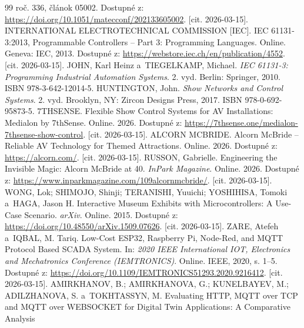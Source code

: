 \begin{thebibliography}{99}
    roč. 336, článok 05002.
    Dostupné z: \url{https://doi.org/10.1051/matecconf/202133605002}. [cit. 2026-03-15].
    INTERNATIONAL ELECTROTECHNICAL COMMISSION [IEC].
    IEC 61131-3:2013, Programmable Controllers -- Part 3:
    Programming Languages. Online.
    Geneva: IEC, 2013.
    Dostupné z: \url{https://webstore.iec.ch/en/publication/4552}. [cit. 2026-03-15].
    JOHN, Karl Heinz a~TIEGELKAMP, Michael.
    \textit{IEC 61131-3: Programming Industrial Automation
    Systems}.
    2. vyd. Berlin: Springer, 2010. ISBN 978-3-642-12014-5.
    HUNTINGTON, John.
    \textit{Show Networks and Control Systems}.
    2. vyd. Brooklyn, NY: Zircon Designs Press, 2017.
    ISBN 978-0-692-95873-5.
    7THSENSE.
    Flexible Show Control Systems for AV Installations:
    Medialon by 7thSense. Online. 2026.
    Dostupné z: \url{https://7thsense.one/medialon-7thsense-show-control}. [cit. 2026-03-15].
    ALCORN MCBRIDE.
    Alcorn McBride -- Reliable AV Technology for Themed
    Attractions. Online. 2026.
    Dostupné z: \url{https://alcorn.com/}. [cit. 2026-03-15].
    RUSSON, Gabrielle.
    Engineering the Invisible Magic: Alcorn McBride at 40.
    \textit{InPark Magazine}. Online. 2026.
    Dostupné z: \url{https://www.inparkmagazine.com/109alcornmcbride/}. [cit. 2026-03-15].
    WONG, Lok; SHIMOJO, Shinji; TERANISHI, Yuuichi;
    YOSHIHISA, Tomoki a~HAGA, Jason H.
    Interactive Museum Exhibits with Microcontrollers:
    A Use-Case Scenario.
    \textit{arXiv}. Online. 2015.
    Dostupné z: \url{https://doi.org/10.48550/arXiv.1509.07626}. [cit. 2026-03-15].
    ZARE, Atefeh a~IQBAL, M. Tariq.
    Low-Cost ESP32, Raspberry Pi, Node-Red, and MQTT Protocol
    Based SCADA System.
    In: \textit{2020 IEEE International IOT, Electronics and
    Mechatronics Conference (IEMTRONICS)}. Online.
    IEEE, 2020, s. 1--5.
    Dostupné z: \url{https://doi.org/10.1109/IEMTRONICS51293.2020.9216412}. [cit. 2026-03-15].
    AMIRKHANOV, B.; AMIRKHANOVA, G.; KUNELBAYEV, M.;
    ADILZHANOVA, S. a~TOKHTASSYN, M.
    Evaluating HTTP, MQTT over TCP and MQTT over WEBSOCKET
    for Digital Twin Applications: A Comparative Analysis

\end{thebibliography}

